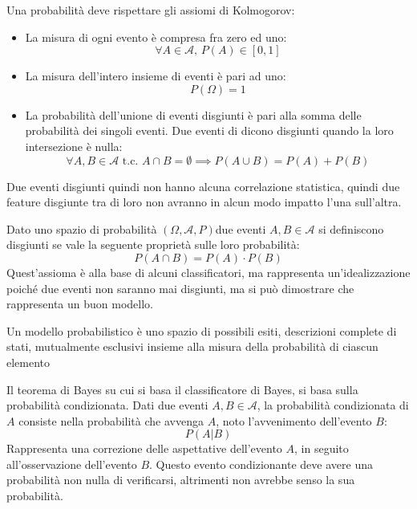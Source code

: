 \documentclass{article}
\numberwithin{equation}{subsection}
\begin{document}
Una probabilità deve rispettare gli assiomi di Kolmogorov:
\begin{itemize}
    \item La misura di ogni evento è compresa fra zero ed uno:
    \begin{equation*}
        \forall A\in\mathscr{A},\,P(A)\in[0,1]
    \end{equation*}
    \item La misura dell'intero insieme di eventi è pari ad uno:
    \begin{equation*}
        P(\Omega)=1
    \end{equation*}
    \item La probabilità dell'unione di eventi disgiunti è pari alla somma delle probabilità dei singoli eventi. Due eventi di dicono disgiunti quando la loro intersezione è nulla:
    \begin{equation*}
        \forall A, B\in\mathscr{A}\text{ t.c. }A\cap B=\emptyset\implies P(A\cup B)=P(A)+P(B)
    \end{equation*}
\end{itemize}
Due eventi disgiunti quindi non hanno alcuna correlazione statistica, quindi due feature disgiunte tra di loro non avranno in alcun modo impatto l'una sull'altra. 

Dato uno spazio di probabilità $(\Omega, \mathscr{A},P)$due eventi $A, B\in\mathscr{A}$ si definiscono disgiunti se 
vale la seguente proprietà sulle loro probabilità:
\begin{equation*}
    P(A\cap B)=P(A)\cdot P(B)
\end{equation*}
Quest'assioma è alla base di alcuni classificatori, ma rappresenta un'idealizzazione poiché due eventi non saranno mai disgiunti, ma si può dimostrare che rappresenta un buon modello. 


Un modello probabilistico è uno spazio di possibili esiti, descrizioni complete di stati, mutualmente esclusivi insieme alla misura della probabilità di ciascun elemento

Il teorema di Bayes su cui si basa il classificatore di Bayes, si basa sulla probabilità condizionata. Dati due eventi $A,B\in\mathscr{A}$, la probabilità condizionata di $A$ consiste nella probabilità che avvenga $A$, noto l'avvenimento dell'evento $B$: 
\begin{equation*}
    P(A|B)
\end{equation*}
Rappresenta una correzione delle aspettative dell'evento $A$, in seguito all'osservazione dell'evento $B$. Questo evento condizionante deve avere una probabilità non nulla di verificarsi, altrimenti non avrebbe senso la sua probabilità. 
\end{document}
